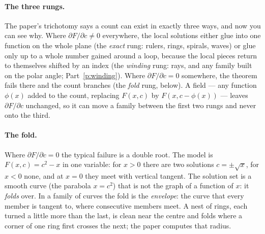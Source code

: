 \documentclass[10pt]{article}
\theoremstyle{plain}
\theoremstyle{definition}
\begin{document}
\paragraph{The three rungs.}
The paper's trichotomy says a count can exist in exactly three ways, and
now you can see why. Where $\partial F/\partial c\ne0$ everywhere, the
local solutions either glue into one function on the whole plane (the
\emph{exact} rung: rulers, rings, spirals, waves) or glue only up to a
whole number gained around a loop, because the local pieces return to
themselves shifted by an index (the \emph{winding} rung: rays, and any
family built on the polar angle; Part~\ref{p:winding}). Where
$\partial F/\partial c=0$ somewhere, the theorem fails there and the count
branches (the \emph{fold} rung, below). A field --- any function $\phi(x)$
added to the count, replacing $F(x,c)$ by $F(x,c-\phi(x))$ --- leaves
$\partial F/\partial c$ unchanged, so it can move a family between the
first two rungs and never onto the third.

\paragraph{The fold.}
Where $\partial F/\partial c=0$ the typical failure is a double root. The
model is $F(x,c)=c^2-x$ in one variable: for $x>0$ there are two solutions
$c=\pm\sqrt x$, for $x<0$ none, and at $x=0$ they meet with vertical
tangent. The solution set is a smooth curve (the parabola $x=c^2$) that is
not the graph of a function of $x$: it \emph{folds} over. In a family of
curves the fold is the \emph{envelope}: the curve that every member is
tangent to, where consecutive members meet. A nest of rings, each turned
a little more than the last, is clean near the centre and folds where a
corner of one ring first crosses the next; the paper computes that radius.
\end{document}
